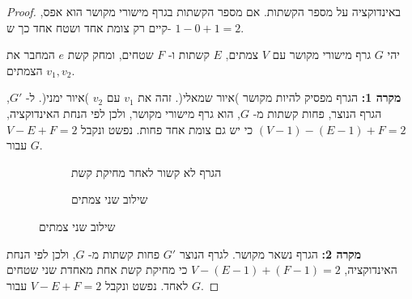 \begin{proof}
באינדוקציה על מספר הקשתות. אם מספר הקשתות בגרף מישורי מקושר הוא אפס, קיים רק צומת אחד ושטח אחד כך ש-%
$1-0+1=2$.

יהי 
$G$
גרף מישורי מקושר עם 
$V$
צמתים, 
$E$
קשתות ו-%
$F$
שטחים, ומחק קשת 
$e$
המחבר את הצמתים
$v_1,v_2$.


\textbf{מקרה 1:}
הגרף מפסיק להיות מקושר )איור שמאלי(. זהה את
$v_1$
עם
$v_2$
)איור ימני(.
ל-%
$G'$,
הגרף הנוצר, פחות קשתות מ-%
$G$,
הוא גרף מישורי מקושר,
ולכן לפי הנחת האינדוקציה,
$(V-1)-(E-1)+F=2$
כי יש גם צומת אחד פחות. נפשט ונקבל
$V-E+F=2$
עבור
$G$.

\begin{figure}[htb]
\begin{center}
\begin{subfigure}{.4\textwidth}
\caption{הגרף לא קשור לאחר מחיקת קשת}\label{f.five-disconnected-removing}
\end{subfigure}
\hspace{3em}
\begin{subfigure}{.4\textwidth}
\caption{שילוב שני צמתים}\label{f.five-disconnected-merge}
\end{subfigure}
\end{center}
\end{figure}

\textbf{מקרה 2:}
הגרף נשאר מקושר. לגרף הנוצר
$G'$
פחות קשתות מ-%
$G$,
ולכן לפי הנחת האינדוקציה,
$V-(E-1)+(F-1)=2$
כי מחיקת קשת אחת מאחדת שני שטחים לאחד. נפשט ונקבל
$V-E+F=2$ 
עבור
$G$.
\end{proof}

